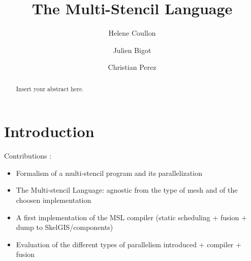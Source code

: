\documentclass[smallextended]{svjour3}       %
\begin{document}
\title{The Multi-Stencil Language}


\author{Helene Coullon \and
        Julien Bigot \and
        Christian Perez
}





\maketitle

\begin{abstract}
Insert your abstract here.
\end{abstract}

\section{Introduction}
\label{sect:introduction}
Contributions :
\begin{itemize}
\item Formalism of a multi-stencil program and its parallelization
\item The Multi-stencil Language: agnostic from the type of mesh and of the choosen implementation
\item A first implementation of the MSL compiler (static scheduling + fusion + dump to SkelGIS/components)
\item Evaluation of the different types of parallelism introduced + compiler + fusion
\end{itemize}
\end{document}
